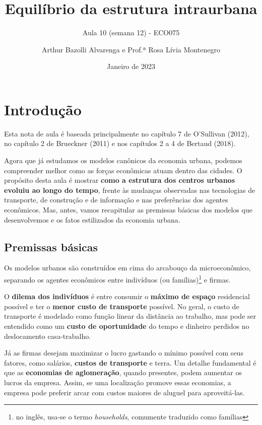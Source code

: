 \documentclass[
  12pt,
  a4paper,
]{article}
\title{Equilíbrio da estrutura intraurbana}
\subtitle{Aula 10 (semana 12) - ECO075}
\author{Arthur Bazolli Alvarenga e Prof.ª Rosa Lívia Montenegro}
\date{Janeiro de 2023}
\begin{document}
\maketitle

\hypertarget{introduuxe7uxe3o}{%
\section{Introdução}\label{introduuxe7uxe3o}}

Esta nota de aula é baseada principalmente no capítulo 7 de O'Sullivan
(2012), no capítulo 2 de Brueckner (2011) e nos capítulos 2 a 4 de
Bertaud (2018).

Agora que já estudamos os modelos canônicos da economia urbana, podemos
compreender melhor como as forças econômicas atuam dentro das cidades. O
propósito desta aula é mostrar \textbf{como a estrutura dos centros
urbanos evoluiu ao longo do tempo}, frente às mudanças observadas nas
tecnologias de transporte, de construção e de informação e nas
preferências dos agentes econômicos. Mas, antes, vamos recapitular as
premissas básicas dos modelos que desenvolvemos e os fatos estilizados
da economia urbana.

\hypertarget{premissas-buxe1sicas}{%
\subsection{Premissas básicas}\label{premissas-buxe1sicas}}

Os modelos urbanos são construídos em cima do arcabouço da
microeconômico, separando os agentes econômicos entre indivíduos (ou
famílias)\footnote{no inglês, usa-se o termo \emph{households},
  comumente traduzido como famílias} e firmas.

O \textbf{dilema dos indivíduos} é entre consumir o \textbf{máximo de
espaço} residencial possível e ter o \textbf{menor custo de transporte}
possível. No geral, o custo de transporte é modelado como função linear
da distância ao trabalho, mas pode ser entendido como um \textbf{custo
de oportunidade} do tempo e dinheiro perdidos no deslocamento
casa-trabalho.

Já as firmas desejam maximizar o lucro gastando o mínimo possível com
seus fatores, como salários, \textbf{custos de transporte} e terra. Um
detalhe fundamental é que as \textbf{economias de aglomeração}, quando
presentes, podem aumentar os lucros da empresa. Assim, se uma
localização promove essas economias, a empresa pode preferir arcar com
custos maiores de aluguel para aproveitá-las.
\end{document}
